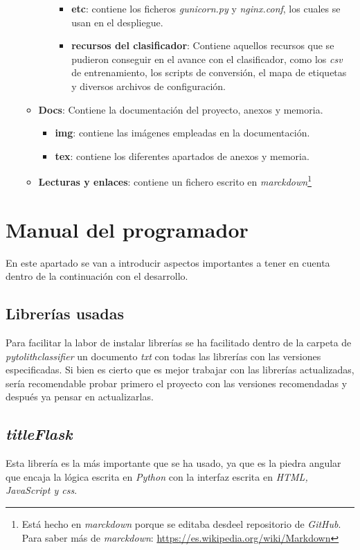 \begin{itemize}
\begin{itemize}
\begin{itemize}
\begin{itemize}
					\item \textbf{etc}: contiene los ficheros \textit{gunicorn.py} y \textit{nginx.conf}, los cuales se usan en el despliegue.
					\item \textbf{recursos del clasificador}: Contiene aquellos recursos que se pudieron conseguir en el avance con el clasificador, como los \textit{csv} de entrenamiento, los scripts de conversión, el mapa de etiquetas y diversos archivos de configuración.
				\end{itemize}
			\end{itemize}
		\item \textbf{Docs}: Contiene la documentación del proyecto, anexos y memoria.
		\begin{itemize}
			\item \textbf{img}: contiene las imágenes empleadas en la documentación.
			\item \textbf{tex}: contiene los diferentes apartados de anexos y memoria.
		\end{itemize}
		\item \textbf{Lecturas y enlaces}: contiene un fichero escrito en \textit{marckdown}\footnote{Está hecho en \textit{marckdown} porque se editaba desdeel repositorio de \textit{GitHub}. Para saber más de \textit{marckdown}: \url{https://es.wikipedia.org/wiki/Markdown}}
	\end{itemize}
\end{itemize}
\section{Manual del programador}
En este apartado se van a introducir aspectos importantes a tener en cuenta dentro de la continuación con el desarrollo.

\subsection{Librerías usadas}
Para facilitar la labor de instalar librerías se ha facilitado dentro de la carpeta de \textit{pytolithclassifier} un documento \textit{txt} con todas las librerías con las versiones especificadas. Si bien es cierto que es mejor trabajar con las librerías actualizadas, sería recomendable probar primero el proyecto con las versiones recomendadas y después ya pensar en actualizarlas.

\subsection{\textit{titleFlask}}
Esta librería es la más importante que se ha usado, ya que es la piedra angular que encaja la lógica escrita en \textit{Python} con la interfaz escrita en \textit{HTML, JavaScript y css}.

